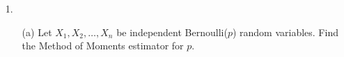 


\renewcommand\assignment{Worksheet 23, Due March 24, 4:15pm}


    \iffalse
    \begin{equation*}
        \begin{gathered}
            Equations go here.
        \end{gathered}
    \end{equation*}

    \resizebox{\hsize}{!}{$Long equation goes here$}

    \begin{multicol*}{# of columns}
    \end{multicol*}

    \horizontal

    \fi


    \begin{itemize}
        \item [1.]
        \begin{itemize}
            \item [(a)]
            Let $X_{1}, X_{2},\dots, X_{n}$ be independent Bernoulli($p$) random variables. Find the Method of Moments estimator for $p$.
            
            \begin{mdframed}
                
            \end{mdframed}
        \end{itemize}
    \end{itemize}
    
